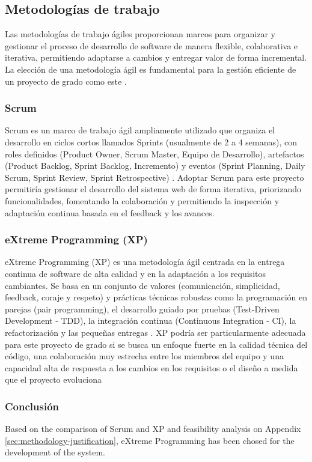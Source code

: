 \subsection{Metodologías de trabajo}
Las metodologías de trabajo ágiles proporcionan marcos para organizar y gestionar el proceso de desarrollo de software de manera flexible, colaborativa e iterativa, permitiendo adaptarse a cambios y entregar valor de forma incremental.
La elección de una metodología ágil es fundamental para la gestión eficiente de un proyecto de grado como este \parencite{Beck2001}.

\subsubsection{Scrum}
Scrum es un marco de trabajo ágil ampliamente utilizado que organiza el desarrollo en ciclos cortos llamados Sprints (usualmente de 2 a 4 semanas), con roles definidos (Product Owner, Scrum Master, Equipo de Desarrollo), artefactos (Product Backlog, Sprint Backlog, Incremento) y eventos (Sprint Planning, Daily Scrum, Sprint Review, Sprint Retrospective) \parencite{SchwaberSutherland2020}.
Adoptar Scrum para este proyecto permitiría gestionar el desarrollo del sistema web de forma iterativa, priorizando funcionalidades, fomentando la colaboración y permitiendo la inspección y adaptación continua basada en el feedback y los avances.

\subsubsection{eXtreme Programming (XP)}
eXtreme Programming (XP) es una metodología ágil centrada en la entrega continua de software de alta calidad y en la adaptación a los requisitos cambiantes.
Se basa en un conjunto de valores (comunicación, simplicidad, feedback, coraje y respeto) y prácticas técnicas robustas como la programación en parejas (pair programming), el desarrollo guiado por pruebas (Test-Driven Development - TDD), la integración continua (Continuous Integration - CI), la refactorización y las pequeñas entregas \parencite{Beck2004}.
XP podría ser particularmente adecuada para este proyecto de grado si se busca un enfoque fuerte en la calidad técnica del código, una colaboración muy estrecha entre los miembros del equipo y una capacidad alta de respuesta a los cambios en los requisitos o el diseño a medida que el proyecto evoluciona

\subsubsection{Conclusión}
Based on the comparison of Scrum and XP and feasibility analysis on Appendix \ref{sec:methodology-justification}, eXtreme Programming has been chosed for the development of the system.
